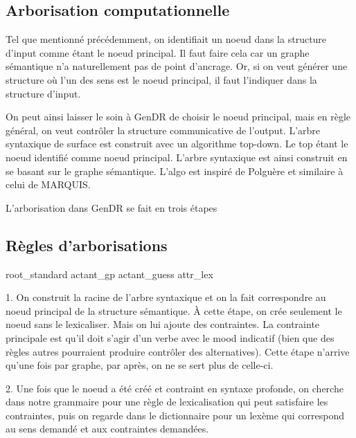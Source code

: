 \subsection{Arborisation computationnelle}
Tel que mentionné précédemment, on identifiait un noeud dans la structure d'input comme étant le noeud principal. Il faut faire cela car un graphe sémantique n'a naturellement pas de point d'ancrage. Or, si on veut générer une structure où l'un des sens est le noeud principal, il faut l'indiquer dans la structure d'input. 

On peut ainsi laisser le soin à GenDR de choisir le noeud principal, mais en règle général, on veut contrôler la structure communicative de l'output. L'arbre syntaxique de surface est construit avec un algorithme top-down. Le top étant le noeud identifié comme noeud principal. L'arbre syntaxique est ainsi construit en se basant sur le graphe sémantique. L'algo est inspiré de Polguère et similaire à celui de MARQUIS.

L'arborisation dans GenDR se fait en trois étapes 

\subsection{Règles d'arborisations}
root\_standard
actant\_gp
actant\_guess
attr\_lex



1. On construit la racine de l'arbre syntaxique et on la fait correspondre au noeud principal de la structure sémantique. À cette étape, on crée seulement le noeud sans le lexicaliser. Mais on lui ajoute des contraintes. La contrainte principale est qu'il doit s'agir d'un verbe avec le mood indicatif (bien que des règles autres pourraient produire contrôler des alternatives). Cette étape n'arrive qu'une fois par graphe, par après, on ne se sert plus de celle-ci.

2. Une fois que le noeud a été créé et contraint en syntaxe profonde, on cherche dans notre grammaire pour une règle de lexicalisation qui peut satisfaire les contraintes, puis on regarde dans le dictionnaire pour un lexème qui correspond au sens demandé et aux contraintes demandées.


